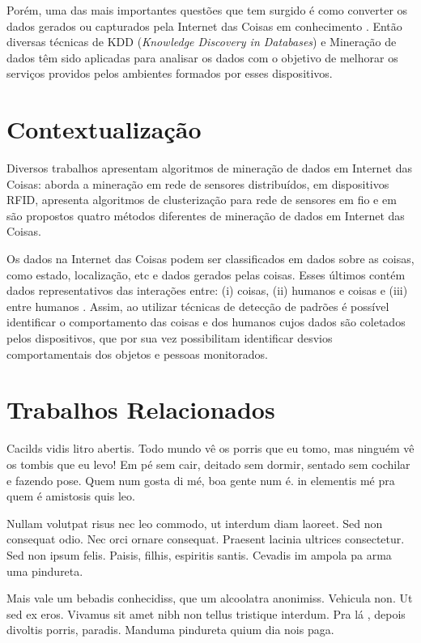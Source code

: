 Porém, uma das mais importantes questões que tem surgido é como converter os dados gerados ou capturados pela Internet das Coisas em conhecimento \cite{000-000}. Então diversas técnicas de KDD (\textit{Knowledge Discovery in Databases}) e Mineração de dados têm sido aplicadas para analisar os dados com o objetivo de melhorar os serviços providos pelos ambientes formados por esses dispositivos.

\section{Contextualização} \label{sec:context}


Diversos trabalhos apresentam algoritmos de mineração de dados em Internet das Coisas:  \cite{000-014} aborda a mineração em rede de sensores distribuídos,  \cite{000-015} em dispositivos RFID, \cite{000-056} apresenta algoritmos de clusterização para rede de sensores em fio e em \cite{003-000} são propostos quatro métodos diferentes de mineração de dados em Internet das Coisas.

Os dados na Internet das Coisas podem ser classificados em dados sobre as coisas, como estado, localização, etc e dados gerados pelas coisas. Esses últimos contém dados representativos das interações entre: (i) coisas, (ii) humanos e coisas e (iii) entre humanos \cite{000-018}. Assim, ao utilizar técnicas de detecção de padrões é possível identificar o comportamento das coisas e dos humanos cujos dados são coletados pelos dispositivos, que por sua vez possibilitam identificar desvios comportamentais dos objetos e pessoas monitorados. 

\section{Trabalhos Relacionados} \label{sec:trabRelac}
Cacilds vidis litro abertis. Todo mundo vê os porris que eu tomo, mas ninguém vê os tombis que eu levo! Em pé sem cair, deitado sem dormir, sentado sem cochilar e fazendo pose. Quem num gosta di mé, boa gente num é. in elementis mé pra quem é amistosis quis leo.

Nullam volutpat risus nec leo commodo, ut interdum diam laoreet. Sed non consequat odio. Nec orci ornare consequat. Praesent lacinia ultrices consectetur. Sed non ipsum felis. Paisis, filhis, espiritis santis. Cevadis im ampola pa arma uma pindureta.

Mais vale um bebadis conhecidiss, que um alcoolatra anonimiss. Vehicula non. Ut sed ex eros. Vivamus sit amet nibh non tellus tristique interdum. Pra lá , depois divoltis porris, paradis. Manduma pindureta quium dia nois paga.

